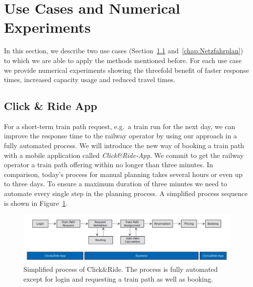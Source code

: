 \section{Use Cases and Numerical Experiments}
\label{chap:useCases}

In this section, we describe two use cases (Section~\ref{chap:CnR} and~\ref{chap:Netzfahrplan}) to which we are able to apply the methods mentioned before. For each use case we provide numerical experiments showing the threefold benefit of faster response times, increased capacity usage and reduced travel times.

\subsection{Click \& Ride App}
\label{chap:CnR}
For a short-term train path request, e.g.\ a train run for the next day, we can improve the response time to the railway operator by using our approach in a fully automated process. We will introduce the new way of booking a train path with a mobile application called \emph{Click\&Ride-App}. We commit to get the railway operator a train path offering within no longer than three minutes. In comparison, today's process for manual planning takes several hours or even up to three days. To ensure a maximum duration of three minutes we need to automate every single step in the planning process. A simplified process sequence is shown in Figure~\ref{fig:process_sequence}.
%
\begin{figure}[htb]
	\centering
	\includegraphics[width=\textwidth]{Bilder/process_sequence.jpg}
	\caption{Simplified process of Click\&Ride. The process is fully automated except for login and requesting a train path as well as booking.}
	\label{fig:process_sequence}
\end{figure}

